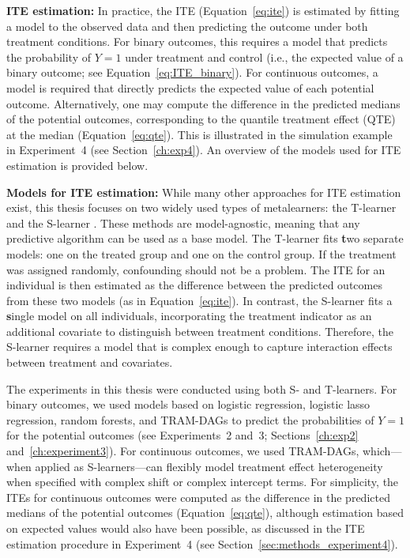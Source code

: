 
\textbf{ITE estimation:} In practice, the ITE (Equation~\ref{eq:ite}) is estimated by fitting a model to the observed data and then predicting the outcome under both treatment conditions. For binary outcomes, this requires a model that predicts the probability of $Y = 1$ under treatment and control (i.e., the expected value of a binary outcome; see Equation~\ref{eq:ITE_binary}). For continuous outcomes, a model is required that directly predicts the expected value of each potential outcome. Alternatively, one may compute the difference in the predicted medians of the potential outcomes, corresponding to the quantile treatment effect (QTE) at the median (Equation~\ref{eq:qte}). This is illustrated in the simulation example in Experiment~4 (see Section~\ref{ch:exp4}). An overview of the models used for ITE estimation is provided below.


\medskip

\textbf{Models for ITE estimation:} \label{sec:ite_models} While many other approaches for ITE estimation exist, this thesis focuses on two widely used types of metalearners: the T-learner and the S-learner \citep{kunzel2019}. These methods are model-agnostic, meaning that any predictive algorithm can be used as a base model. The T-learner fits \textbf{t}wo separate models: one on the treated group and one on the control group. If the treatment was assigned randomly, confounding should not be a problem. The ITE for an individual is then estimated as the difference between the predicted outcomes from these two models (as in Equation~\ref{eq:ite}). In contrast, the S-learner fits a \textbf{s}ingle model on all individuals, incorporating the treatment indicator as an additional covariate to distinguish between treatment conditions. Therefore, the S-learner requires a model that is complex enough to capture interaction effects between treatment and covariates. 

The experiments in this thesis were conducted using both S- and T-learners. For binary outcomes, we used models based on logistic regression, logistic lasso regression, random forests, and TRAM-DAGs to predict the probabilities of $Y = 1$ for the potential outcomes (see Experiments~2 and~3; Sections~\ref{ch:exp2} and~\ref{ch:experiment3}). For continuous outcomes, we used TRAM-DAGs, which—when applied as S-learners—can flexibly model treatment effect heterogeneity when specified with complex shift or complex intercept terms. For simplicity, the ITEs for continuous outcomes were computed as the difference in the predicted medians of the potential outcomes (Equation~\ref{eq:qte}), although estimation based on expected values would also have been possible, as discussed in the ITE estimation procedure in Experiment~4 (see Section~\ref{sec:methods_experiment4}).



